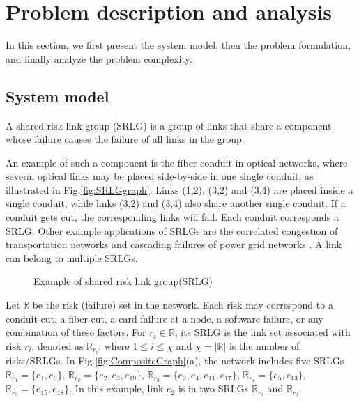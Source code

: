 \section{Problem description and analysis}
\label{sec:Problem}
In this section, we first present the system model, then the problem formulation, and finally analyze the problem complexity. 
\subsection{System model}
A shared risk link group (SRLG) is a group of links that share a component whose failure causes the failure of all links in the group. %

An example of such a component is the fiber conduit \cite{bhandari1994optimal} in optical networks, where several optical links may be placed side-by-side in one single conduit, as illustrated in Fig.\ref{fig:SRLGgraph}. Links (1,2), (3,2) and (3,4) are placed inside a single conduit, while links (3,2) and (3,4) also share another single conduit. If a conduit gets cut, the corresponding links will fail. Each conduit corresponds a SRLG.  Other example applications of SRLGs are the correlated congestion of transportation networks and cascading failures of power grid networks \cite{coudert2007shared}. A link can belong to multiple SRLGs.
\begin{figure}[htbp]
\centering
{}
\caption{Example of shared risk link group(SRLG)}\label{fig:SRLGgraph}
\label{fig:Logic shift operation}
\end{figure}

Let $\mathbb{R}$ be the risk (failure) set in the network. Each risk may correspond to a conduit cut, a fiber cut, a card failure at a node, a software failure, or any combination of these factors. For $r_i \in \mathbb{R}$, its SRLG is the link set associated with risk $r_i$, denoted as $\mathbb{R}_{r_i}$, where $1\leq i\leq \chi$ and $\chi=|{\mathbb{R}}|$ is the number of risks/SRLGs.  In Fig.\ref{fig:CompositeGraph}(a), the network includes five SRLGs $\mathbb{R}_{r_1}=\{e_1,e_9\}$, $\mathbb{R}_{r_2}=\{e_2,e_3,e_{19}\}$, $\mathbb{R}_{r_3}=\{e_2,e_4,e_{11},e_{17}\}$, $\mathbb{R}_{r_4}=\{e_5,e_{13}\}$, $\mathbb{R}_{r_5}=\{e_{15},e_{18}\}$. In this example, link $e_2$ is in two SRLGs $\mathbb{R}_{r_2}$ and $\mathbb{R}_{r_3}$.

